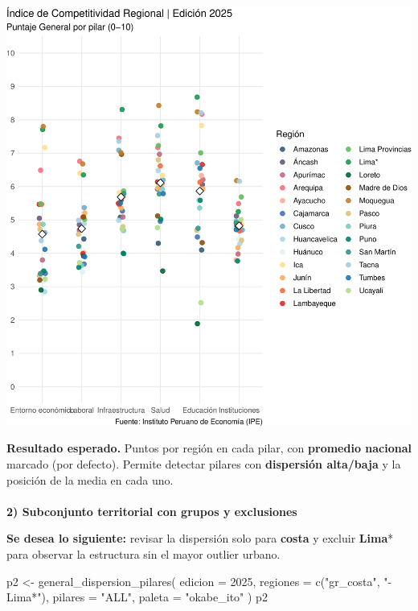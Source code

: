 \documentclass[
  11pt,
  letterpaper,
  DIV=11,
  numbers=noendperiod]{scrartcl}
\makeatletter
\let\oldparagraph\paragraph
\renewcommand{\paragraph}{
    \@ifstar
      \xxxParagraphStar
      \xxxParagraphNoStar
  }
\newcommand{\xxxParagraphStar}[1]{\oldparagraph*{#1}\mbox{}}
\newcommand{\xxxParagraphNoStar}[1]{\oldparagraph{#1}\mbox{}}
\newenvironment{Shaded}{\begin{snugshade}}{\end{snugshade}}
\newcommand{\AttributeTok}[1]{\textcolor[rgb]{0.40,0.45,0.13}{#1}}
\newcommand{\DecValTok}[1]{\textcolor[rgb]{0.68,0.00,0.00}{#1}}
\newcommand{\FunctionTok}[1]{\textcolor[rgb]{0.28,0.35,0.67}{#1}}
\newcommand{\NormalTok}[1]{\textcolor[rgb]{0.00,0.23,0.31}{#1}}
\newcommand{\OtherTok}[1]{\textcolor[rgb]{0.00,0.23,0.31}{#1}}
\newcommand{\StringTok}[1]{\textcolor[rgb]{0.13,0.47,0.30}{#1}}
\makeatother
\begin{document}
\includegraphics{Manual_files/figure-pdf/unnamed-chunk-21-1.pdf}

\textbf{Resultado esperado.} Puntos por región en cada pilar, con
\textbf{promedio nacional} marcado (por defecto). Permite detectar
pilares con \textbf{dispersión alta/baja} y la posición de la media en
cada uno.

\paragraph{\texorpdfstring{\textbf{2) Subconjunto territorial con grupos
y
exclusiones}}{2) Subconjunto territorial con grupos y exclusiones}}\label{subconjunto-territorial-con-grupos-y-exclusiones}

\textbf{Se desea lo siguiente:} revisar la dispersión solo para
\textbf{costa} y excluir \textbf{Lima}* para observar la estructura sin
el mayor outlier urbano.

\begin{Shaded}
\begin{Highlighting}[]
\NormalTok{p2 }\OtherTok{\textless{}{-}} \FunctionTok{general\_dispersion\_pilares}\NormalTok{(}
  \AttributeTok{edicion =} \DecValTok{2025}\NormalTok{,}
  \AttributeTok{regiones =} \FunctionTok{c}\NormalTok{(}\StringTok{"gr\_costa"}\NormalTok{, }\StringTok{"{-}Lima*"}\NormalTok{),}
  \AttributeTok{pilares  =} \StringTok{"ALL"}\NormalTok{,}
  \AttributeTok{paleta   =} \StringTok{"okabe\_ito"}
\NormalTok{)}
\NormalTok{p2}
\end{Highlighting}
\end{Shaded}
\end{document}
